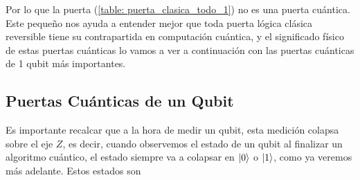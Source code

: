 \documentclass{article}
\numberwithin{equation}{section} %
\begin{document}
    \vspace{2.5mm}

    Por lo que la puerta (\ref{table: puerta_clasica_todo_1}) no es una puerta cuántica. Este pequeño nos ayuda a entender mejor que toda puerta lógica clásica reversible tiene su contrapartida en computación cuántica, y el significado físico de estas puertas cuánticas lo vamos a ver a continuación con las puertas cuánticas de 1 qubit más importantes.

    \vspace{10mm}





    \subsection{Puertas Cuánticas de un Qubit}

    \vspace{5mm}

    









    
    Es importante recalcar que a la hora de medir un qubit, esta medición colapsa sobre el eje \( Z \), es decir, cuando observemos el estado de un qubit al finalizar un algoritmo cuántico, el estado siempre va a colapsar en \( \ket{0} \) o \( \ket{1} \), como ya veremos más adelante. Estos estados son
\end{document}
